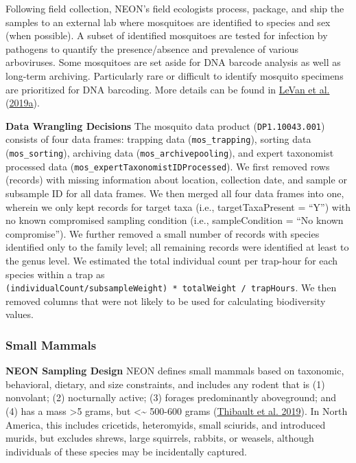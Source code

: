 \documentclass[
  12pt,
]{article}
\begin{document}
Following field collection, NEON's field ecologists process, package, and ship the samples to an external lab where mosquitoes are identified to species and sex (when possible). A subset of identified mosquitoes are tested for infection by pathogens to quantify the presence/absence and prevalence of various arboviruses. Some mosquitoes are set aside for DNA barcode analysis as well as long-term archiving. Particularly rare or difficult to identify mosquito specimens are prioritized for DNA barcoding. More details can be found in \protect\hyperlink{ref-LeVan2019b}{LeVan et al.} (\protect\hyperlink{ref-LeVan2019b}{2019a}).

\textbf{Data Wrangling Decisions} The mosquito data product (\texttt{DP1.10043.001}) consists of four data frames: trapping data (\texttt{mos\_trapping}), sorting data (\texttt{mos\_sorting}), archiving data (\texttt{mos\_archivepooling}), and expert taxonomist processed data (\texttt{mos\_expertTaxonomistIDProcessed}). We first removed rows (records) with missing information about location, collection date, and sample or subsample ID for all data frames. We then merged all four data frames into one, wherein we only kept records for target taxa (i.e., targetTaxaPresent = ``Y'') with no known compromised sampling condition (i.e., sampleCondition = ``No known compromise''). We further removed a small number of records with species identified only to the family level; all remaining records were identified at least to the genus level. We estimated the total individual count per trap-hour for each species within a trap as \texttt{(individualCount/subsampleWeight)\ *\ totalWeight\ /\ trapHours}. We then removed columns that were not likely to be used for calculating biodiversity values.

\hypertarget{small-mammals}{%
\subsubsection{Small Mammals}\label{small-mammals}}

\textbf{NEON Sampling Design} NEON defines small mammals based on taxonomic, behavioral, dietary, and size constraints, and includes any rodent that is (1) nonvolant; (2) nocturnally active; (3) forages predominantly aboveground; and (4) has a mass \textgreater5 grams, but \textless\textasciitilde{} 500-600 grams (\protect\hyperlink{ref-thibault2019TOS}{Thibault et al. 2019}). In North America, this includes cricetids, heteromyids, small sciurids, and introduced murids, but excludes shrews, large squirrels, rabbits, or weasels, although individuals of these species may be incidentally captured.
\end{document}
